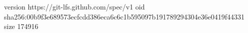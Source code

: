 version https://git-lfs.github.com/spec/v1
oid sha256:00b9f3e689573ecfcdd386eca6c6c1b595097b191789294304e36e0419f44331
size 174916
